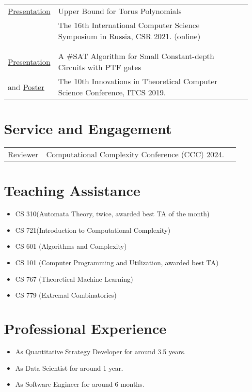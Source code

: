 \documentclass[a4paper,10pt]{article}
\begin{document}
\begin{tabular}{p{2.5cm}|p{11cm}l}
  \href{https://vaibhkrishan.github.io/files/slides/torus.pdf}{Presentation} & Upper Bound for Torus Polynomials \\
  & The 16th International Computer Science Symposium in Russia, CSR 2021. (online) \\\multicolumn{2}{c}{} \\
  \\
  \href{https://vaibhkrishan.github.io/files/slides/ptf.pdf}{Presentation} & A \#SAT Algorithm for Small Constant-depth Circuits with PTF gates \\
  and \href{https://vaibhkrishan.github.io/files/slides/poster.pdf}{Poster} & The 10th Innovations in Theoretical Computer Science Conference, ITCS 2019.
\end{tabular}

\section{Service and Engagement}
\begin{tabular}{p{2.5cm}|p{11cm}l}
  Reviewer & Computational Complexity Conference (CCC) 2024.
\end{tabular}

\section{Teaching Assistance}

\begin{itemize}
  \item CS 310(Automata Theory, twice, awarded best TA of the month)
  \item CS 721(Introduction to Computational Complexity)
  \item CS 601 (Algorithms and Complexity)
  \item CS 101 (Computer Programming and Utilization, awarded best TA)
  \item CS 767 (Theoretical Machine Learning)
  \item CS 779 (Extremal Combinatorics)
\end{itemize}

\section{Professional Experience}

\begin{itemize}
  \item As Quantitative Strategy Developer for around 3.5 years.
  \item As Data Scientist for around 1 year.
  \item As Software Engineer for around 6 months.
\end{itemize}
\end{document}
